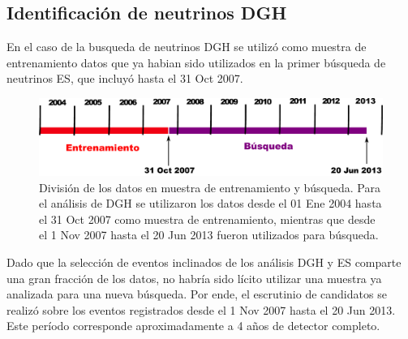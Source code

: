 	\subsection{Identificación de neutrinos DGH}
	
	En el caso de la busqueda de neutrinos DGH se utilizó como muestra de entrenamiento datos que ya habian sido utilizados en la primer búsqueda de neutrinos ES, que incluyó hasta el 31 Oct 2007.
	\begin{figure}[ht]
	\begin{center}
	\includegraphics[width=\textwidth]{fig/seleccionAuger/periodosDGH}
	\caption{División de los datos en muestra de entrenamiento y búsqueda. Para el análisis de DGH se utilizaron los datos desde el 01 Ene 2004 hasta el 31 Oct 2007 como muestra de entrenamiento, mientras que desde el 1 Nov 2007 hasta el 20 Jun 2013 fueron utilizados para búsqueda.}
	\label{fig:periodosDGH}
	\end{center}
	\end{figure}
	Dado que la selección de eventos inclinados de los análisis DGH y ES comparte una gran fracción de los datos, no habría sido lícito utilizar una muestra ya analizada para una nueva búsqueda.
	Por ende, el escrutinio de candidatos se realizó sobre los eventos registrados desde el 1 Nov 2007 hasta el 20 Jun 2013.
	Este período corresponde aproximadamente a 4 años de detector completo.
	
